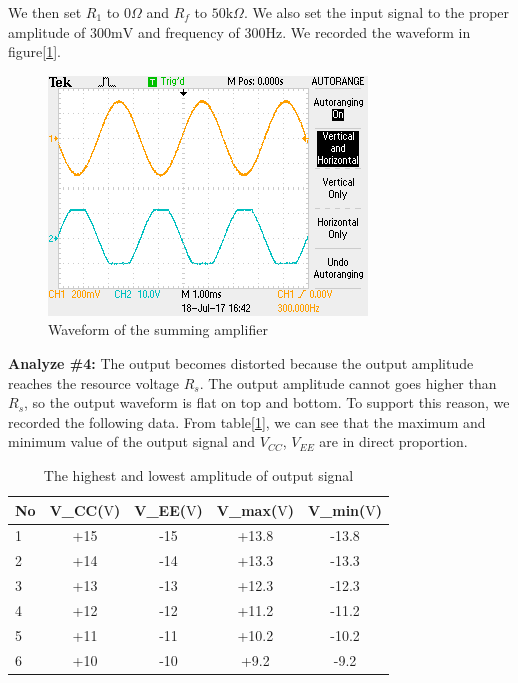 \phantom{ } We then set $ R_1 $ to $ 0\si{\Omega} $ and $ R_f $ to $ 50\si{\kilo\Omega} $. We also set the input signal to the proper amplitude of 300$ \si{\milli\volt} $ and frequency of $ 300\si{\hertz} $. We recorded the waveform in figure[\ref{fig:108}].
\begin{figure}[!htbp]
	\centering 
	\begin{framed}
		\includegraphics[width=\linewidth]{images/osc2.png}
		\caption{Waveform of the summing amplifier}
		\label{fig:108} 
	\end{framed}
\end{figure} 
\hfill \newline
\textbf{Analyze \#4:} \newline
\phantom{ } The output becomes distorted because the output amplitude reaches the resource voltage $ R_s $. The output amplitude cannot goes higher than $ R_s $, so the output waveform is flat on top and bottom. To support this reason, we recorded the following data. From table[\ref{tab:distort}], we can see that the maximum and minimum value of the output signal and $ V_{CC} $, $ V_{EE} $ are in direct proportion.\\
\begin{table}[!htbp]
	\centering
	\caption{The highest and lowest amplitude of output signal}
	\begin{tabular}{lcccc}
		\toprule
		No &V\_CC($ \si{\volt} $) &V\_EE($ \si{\volt} $)&V\_max($ \si{\volt} $)&V\_min($ \si{\volt} $)\\
		\midrule
		1	&+15	&-15	&+13.8	&-13.8	\\
		2	&+14	&-14	&+13.3	&-13.3	\\
		3	&+13	&-13	&+12.3	&-12.3	\\
		4	&+12	&-12	&+11.2	&-11.2	\\
		5	&+11	&-11	&+10.2	&-10.2	\\
		6	&+10	&-10	&+9.2	&-9.2	\\
		\bottomrule
	\end{tabular}
	\label{tab:distort}
\end{table}

